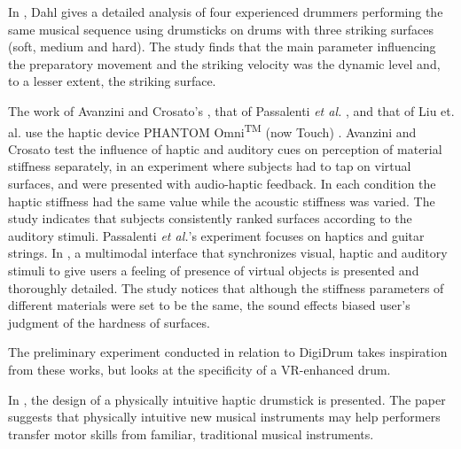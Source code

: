\documentclass{article}
\begin{document}
In \cite{Dahl:2004}, Dahl gives a detailed analysis of four experienced drummers performing the same musical sequence using drumsticks on drums with three striking surfaces (soft, me\-dium and hard). The study finds that the main parameter influencing the preparatory movement and the striking velocity was the dynamic level and, to a lesser extent, the striking surface.

The work of Avanzini and Crosato's \cite{avanzini2006}, that of Passalenti \emph{et al.}  \cite{passalenti2019}, and that of Liu et. al. use the haptic device PHANTOM\textregistered{} Omni\textsuperscript{TM} (now Touch) \cite{phantom}. Avanzini and Crosato test the influence of haptic and auditory cues on perception of material stiffness separately, in an experiment where subjects had to tap on virtual surfaces, and were presented with audio-haptic feedback. In each condition the haptic stiffness had the same value while the acoustic stiffness was varied. The study indicates that subjects consistently ranked surfaces according to the auditory stimuli.
Passalenti \emph{et al.}'s experiment focuses on haptics and guitar strings. In \cite{Liu:2008}, a multimodal interface that synchronizes visual, haptic and auditory stimuli to give users a feeling of presence of virtual objects is presented and thoroughly detailed. The study notices that although the stiffness parameters of different materials were set to be the same, the sound effects biased user's judgment of the hardness of surfaces.

The preliminary experiment conducted in relation to Digi\-Drum takes inspiration from these works, but looks at the specificity of a VR-enhanced drum.

In \cite{Berdahl2007API}, the design of a physically intuitive haptic drumstick is presented. The paper suggests that physically intuitive new musical instruments may help performers transfer motor skills from familiar, traditional musical instruments. 
\end{document}
